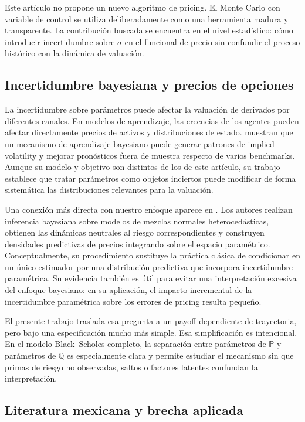 \documentclass[12pt,letterpaper]{article}
\newcommand{\Pmeasure}{\mathbb{P}}
\newcommand{\Qmeasure}{\mathbb{Q}}
\begin{document}
Este artículo no propone un nuevo algoritmo de pricing. El Monte Carlo con variable de control se utiliza deliberadamente como una herramienta madura y transparente. La contribución buscada se encuentra en el nivel estadístico: cómo introducir incertidumbre sobre $\sigma$ en el funcional de precio sin confundir el proceso histórico con la dinámica de valuación.

\subsection{Incertidumbre bayesiana y precios de opciones}

La incertidumbre sobre parámetros puede afectar la valuación de derivados por diferentes canales. En modelos de aprendizaje, las creencias de los agentes pueden afectar directamente precios de activos y distribuciones de estado. \citet{guidolin2003} muestran que un mecanismo de aprendizaje bayesiano puede generar patrones de implied volatility y mejorar pronósticos fuera de muestra respecto de varios benchmarks. Aunque su modelo y objetivo son distintos de los de este artículo, su trabajo establece que tratar parámetros como objetos inciertos puede modificar de forma sistemática las distribuciones relevantes para la valuación.

Una conexión más directa con nuestro enfoque aparece en \citet{romboutsstentoft2014}. Los autores realizan inferencia bayesiana sobre modelos de mezclas normales heterocedásticas, obtienen las dinámicas neutrales al riesgo correspondientes y construyen densidades predictivas de precios integrando sobre el espacio paramétrico. Conceptualmente, su procedimiento sustituye la práctica clásica de condicionar en un único estimador por una distribución predictiva que incorpora incertidumbre paramétrica. Su evidencia también es útil para evitar una interpretación excesiva del enfoque bayesiano: en su aplicación, el impacto incremental de la incertidumbre paramétrica sobre los errores de pricing resulta pequeño.

El presente trabajo traslada esa pregunta a un payoff dependiente de trayectoria, pero bajo una especificación mucho más simple. Esa simplificación es intencional. En el modelo Black--Scholes completo, la separación entre parámetros de $\Pmeasure$ y parámetros de $\Qmeasure$ es especialmente clara y permite estudiar el mecanismo sin que primas de riesgo no observadas, saltos o factores latentes confundan la interpretación.

\subsection{Literatura mexicana y brecha aplicada}
\end{document}

